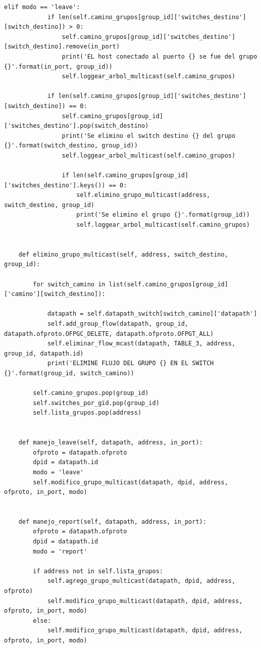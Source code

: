 \documentclass[12pt,a4paper,oneside]{book}
\begin{document}
\begin{lstlisting}[style=codigobase,  label = cod_correrP, caption= controlador.py]
        elif modo == 'leave':
            if len(self.camino_grupos[group_id]['switches_destino'][switch_destino]) > 0:
                self.camino_grupos[group_id]['switches_destino'][switch_destino].remove(in_port)
                print('EL host conectado al puerto {} se fue del grupo {}'.format(in_port, group_id))
                self.loggear_arbol_multicast(self.camino_grupos)

            if len(self.camino_grupos[group_id]['switches_destino'][switch_destino]) == 0:
                self.camino_grupos[group_id]['switches_destino'].pop(switch_destino)
                print('Se elimino el switch destino {} del grupo {}'.format(switch_destino, group_id))
                self.loggear_arbol_multicast(self.camino_grupos)

                if len(self.camino_grupos[group_id]['switches_destino'].keys()) == 0:
                    self.elimino_grupo_multicast(address, switch_destino, group_id)
                    print('Se elimino el grupo {}'.format(group_id))
                    self.loggear_arbol_multicast(self.camino_grupos)


    def elimino_grupo_multicast(self, address, switch_destino, group_id):

        for switch_camino in list(self.camino_grupos[group_id]['camino'][switch_destino]):

            datapath = self.datapath_switch[switch_camino]['datapath']
            self.add_group_flow(datapath, group_id, datapath.ofproto.OFPGC_DELETE, datapath.ofproto.OFPGT_ALL)
            self.eliminar_flow_mcast(datapath, TABLE_3, address, group_id, datapath.id)
            print('ELIMINE FLUJO DEL GRUPO {} EN EL SWITCH {}'.format(group_id, switch_camino))

        self.camino_grupos.pop(group_id)
        self.switches_por_gid.pop(group_id)
        self.lista_grupos.pop(address)


    def manejo_leave(self, datapath, address, in_port):
        ofproto = datapath.ofproto
        dpid = datapath.id
        modo = 'leave'
        self.modifico_grupo_multicast(datapath, dpid, address, ofproto, in_port, modo)


    def manejo_report(self, datapath, address, in_port):
        ofproto = datapath.ofproto
        dpid = datapath.id
        modo = 'report'

        if address not in self.lista_grupos:
            self.agrego_grupo_multicast(datapath, dpid, address, ofproto)
            self.modifico_grupo_multicast(datapath, dpid, address, ofproto, in_port, modo)
        else:
            self.modifico_grupo_multicast(datapath, dpid, address, ofproto, in_port, modo)



\end{lstlisting}
\end{document}
